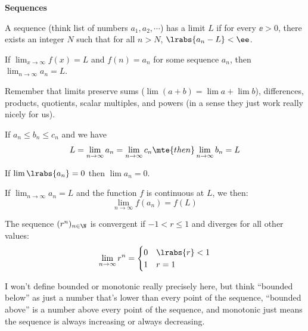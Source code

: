 
\chead{\today}
\graphicspath{ {\string~/Desktop} }
\usetikzlibrary{arrows}
\newcommand{\ans}[1]{ \noindent {\color{red} \textbf{Answer:} #1}}
\renewcommand{\ans}[1]{\vspace{3in}}

\begin{center}
\textbf{Sequences}
\end{center}

\begin{defi}
A sequence (think list of numbers $a_1, a_2, \cdots$) has a limit $L$ if for every $\ee > 0$, there exists an integer $N$ such that for all $n > N$, $\lrabs{a_n - L} < \ee$.
\end{defi}
\begin{thm}
If $\lim_{x \to \infty} f(x) = L$ and $f(n) = a_n$ for some sequence $a_n$, then $\lim_{n \to \infty} a_n = L$. 
\label{limitfn}
\end{thm}
\begin{aun}
Remember that limits preserve sums ($\lim (a+b) = \lim a + \lim b$), differences, products, quotients, scalar multiples, and powers (in a sense they just work really nicely for us). 
\end{aun}
\begin{thm} If $a_n \leq b_n \leq c_n$ and we have
\[
L = \lim_{n \to \infty} a_n = \lim_{n \to \infty} c_n \mte{ then } \lim_{n \to \infty} b_n  = L
\]
\end{thm}
\begin{thm}
If $\lim \lrabs{a_n} = 0$ then $\lim a_n  = 0$.
\label{conv}
\end{thm}
\begin{thm}
If $\lim_{n \to \infty} a_n = L$ and the function $f$ is continuous at $L$, we then:
\[
\lim_{n \to \infty} f(a_n) = f(L)
\]
\end{thm}
\begin{thm}
The sequence $(r^n)_{n \in \N}$ is convergent if $-1 < r \leq 1$ and diverges for all other values:
\[
\lim _{n \to \infty} r^n = \begin{cases}
0 & \lrabs{r} < 1\\
1 & r = 1
\end{cases}
\]
\end{thm}
\begin{aun}
I won't define bounded or monotonic really precisely here, but think ``bounded below'' as just a number that's lower than every point of the sequence, ``bounded above'' is a number above every point of the sequence, and monotonic just means the sequence is always increasing or always decreasing.
\end{aun}
